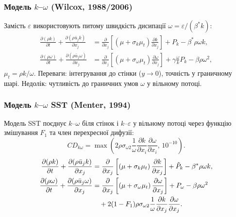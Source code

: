 \documentclass[14pt,a4paper,extarticle]{extarticle}
\begin{document}
\subsubsection{Модель $k$--$\omega$ (Wilcox, 1988/2006)}

Замість $\varepsilon$ використовують питому швидкість дисипації
$\omega = \varepsilon/(\beta^* k)$:
\begin{align}
  \frac{\partial (\rho k)}{\partial t} + \frac{\partial (\rho \bar{u}_j k)}{\partial x_j}
  &= \frac{\partial}{\partial x_j} \left[ \left( \mu + \sigma_k \mu_t \right) \frac{\partial k}{\partial x_j} \right]
    + P_k - \beta^* \rho \omega k, \label{eq:k-omega-k}\\
  \frac{\partial (\rho \omega)}{\partial t} + \frac{\partial (\rho \bar{u}_j \omega)}{\partial x_j}
  &= \frac{\partial}{\partial x_j} \left[ \left( \mu + \sigma_\omega \mu_t \right) \frac{\partial \omega}{\partial x_j} \right]
    + \gamma \frac{\omega}{k} P_k - \beta \rho \omega^2, \label{eq:k-omega-omega}
\end{align}
$\mu_t = \rho k / \omega$. Переваги: інтегрування до стінки ($y \to 0$),
точність у граничному шарі. Недолік: чутливість до граничних умов $\omega$
у вільному потоці.

\subsubsection{Модель $k$--$\omega$ SST (Menter, 1994)}

Модель SST поєднує $k$--$\omega$ біля стінок і $k$--$\varepsilon$ у
вільному потоці через функцію змішування $F_1$ та член перехресної дифузії:
\begin{equation}
  CD_{k\omega} = \max \left( 2 \rho \sigma_{\omega 2} \frac{1}{\omega}
    \frac{\partial k}{\partial x_i} \frac{\partial \omega}{\partial x_i},\, 10^{-10} \right).
  \label{eq:cd-kw}
\end{equation}
\begin{align}
  \frac{\partial (\rho k)}{\partial t} + \frac{\partial (\rho \bar{u}_j k)}{\partial x_j}
  &= \frac{\partial}{\partial x_j} \left[ \left( \mu + \sigma_k \mu_t \right) \frac{\partial k}{\partial x_j} \right]
    + \tilde{P}_k - \beta^* \rho \omega k, \label{eq:sst-k}\\
  \frac{\partial (\rho \omega)}{\partial t} + \frac{\partial (\rho \bar{u}_j \omega)}{\partial x_j}
  &= \frac{\partial}{\partial x_j} \left[ \left( \mu + \sigma_\omega \mu_t \right) \frac{\partial \omega}{\partial x_j} \right]
    + P_\omega - \beta \rho \omega^2 \notag\\
  &\quad + 2(1 - F_1) \rho \sigma_{\omega 2} \frac{1}{\omega}
    \frac{\partial k}{\partial x_j} \frac{\partial \omega}{\partial x_j}. \label{eq:sst-omega}
\end{align}
\end{document}
